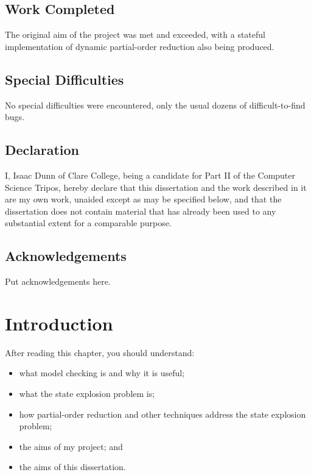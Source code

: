 \documentclass[12pt,a4paper,twoside,openright]{report}
\newenvironment{understandinglist}
	{\begin{itemize} \itemsep 0em}{\end{itemize}}
\begin{document}
\section*{Work Completed}

The original aim of the project was met and exceeded, with
a stateful implementation of dynamic partial-order reduction
also being produced.

\section*{Special Difficulties}

No special difficulties were encountered, only the usual dozens of
difficult-to-find bugs.
 
\newpage
\section*{Declaration}

I, Isaac Dunn of Clare College, being a candidate for Part II of the Computer
Science Tripos, hereby declare
that this dissertation and the work described in it are my own work,
unaided except as may be specified below, and that the dissertation
does not contain material that has already been used to any substantial
extent for a comparable purpose.

\bigskip
{}

\bigskip
{}

\tableofcontents

\listoffigures

\newpage
\section*{Acknowledgements}

Put acknowledgements here.


\pagestyle{headings}

\chapter{Introduction}
After reading this chapter,
you should understand:
\begin{understandinglist}
	\item what model checking is and why it is useful;
	\item what the state explosion problem is;
	\item how partial-order reduction and other
	techniques address the state explosion problem;
	\item the aims of my project; and
	\item the aims of this dissertation.
\end{understandinglist}
\end{document}
